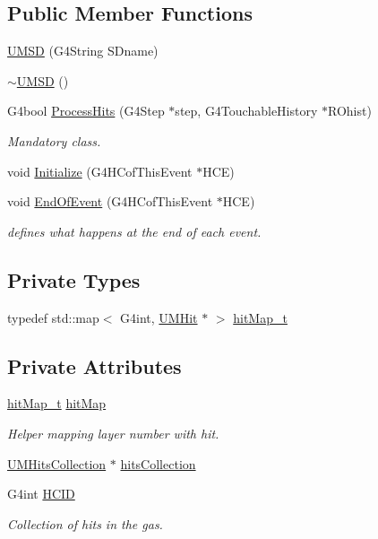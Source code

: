 \subsection*{Public Member Functions}
\begin{DoxyCompactItemize}
\item 
\hyperlink{classUMSD_aba31b29e6b53618650ac627f49e813f8}{U\+M\+S\+D} (G4\+String S\+Dname)
\item 
\hyperlink{classUMSD_a8e9150046d7e00c3179d30c27fb01e26}{$\sim$\+U\+M\+S\+D} ()
\item 
G4bool \hyperlink{classUMSD_afdcb8b2b14fa1e9c22f82d305381849a}{Process\+Hits} (G4\+Step $\ast$step, G4\+Touchable\+History $\ast$R\+Ohist)
\begin{DoxyCompactList}\small\item\em Mandatory class. \end{DoxyCompactList}\item 
void \hyperlink{classUMSD_a15c7a91080ef37306aadec1def3e5acd}{Initialize} (G4\+H\+Cof\+This\+Event $\ast$H\+C\+E)
\item 
void \hyperlink{classUMSD_a62353fbde18e0b32cc1d8ea455c278af}{End\+Of\+Event} (G4\+H\+Cof\+This\+Event $\ast$H\+C\+E)
\begin{DoxyCompactList}\small\item\em defines what happens at the end of each event. \end{DoxyCompactList}\end{DoxyCompactItemize}
\subsection*{Private Types}
\begin{DoxyCompactItemize}
\item 
typedef std\+::map$<$ G4int, \hyperlink{classUMHit}{U\+M\+Hit} $\ast$ $>$ \hyperlink{classUMSD_a6da3356d9e0e0512f26ac3c11cdbb6d8}{hit\+Map\+\_\+t}
\end{DoxyCompactItemize}
\subsection*{Private Attributes}
\begin{DoxyCompactItemize}
\item 
\hyperlink{classUMSD_a6da3356d9e0e0512f26ac3c11cdbb6d8}{hit\+Map\+\_\+t} \hyperlink{classUMSD_acc453bf46c439aec3d5c82715152fab4}{hit\+Map}
\begin{DoxyCompactList}\small\item\em Helper mapping layer number with hit. \end{DoxyCompactList}\item 
\hyperlink{UMHit_8hh_ae4ae3db383f3d522b08825b4ecbfc3e6}{U\+M\+Hits\+Collection} $\ast$ \hyperlink{classUMSD_a6b2f2c42a6be884619371760d8b8752d}{hits\+Collection}
\item 
G4int \hyperlink{classUMSD_a639c42664519bddf251bd758ebc09635}{H\+C\+I\+D}
\begin{DoxyCompactList}\small\item\em Collection of hits in the gas. \end{DoxyCompactList}\end{DoxyCompactItemize}


